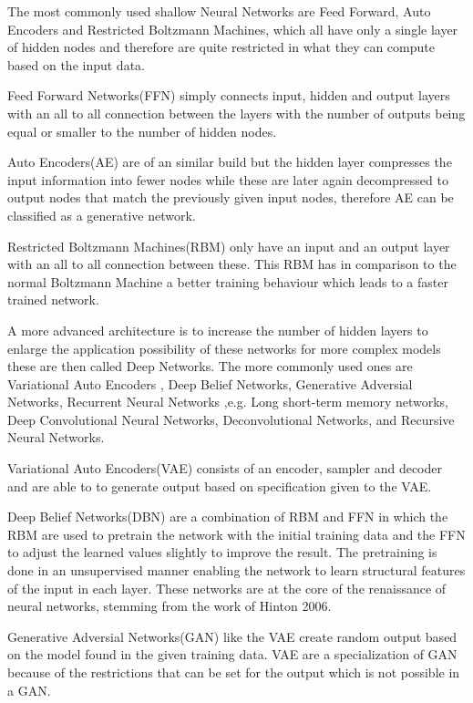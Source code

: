 \documentclass[conference]{IEEEtran}
\begin{document}

The most commonly used shallow Neural Networks are Feed Forward, Auto Encoders and Restricted Boltzmann Machines, which all have only a single layer of hidden nodes and therefore are quite restricted in what they can compute based on the input data. 

Feed Forward Networks(FFN) simply connects input, hidden and output layers with an all to all connection between the layers with the number of outputs being equal or smaller to the number of hidden nodes.

Auto Encoders(AE) are of an similar build but the hidden layer compresses the input information into fewer nodes while these are later again decompressed to output nodes that match the previously given input nodes, therefore AE can be classified as a generative network.

Restricted Boltzmann Machines(RBM) only have an input and an output layer with an all to all connection between these. This RBM has in comparison to the normal Boltzmann Machine a better training behaviour which leads to a faster trained network.

A more advanced architecture is to increase the number of hidden layers to enlarge the application possibility of these networks for more complex models these are then called Deep Networks. The more commonly used ones are Variational Auto Encoders , Deep Belief Networks, Generative Adversial Networks, Recurrent Neural Networks ,e.g. Long short-term memory networks, Deep Convolutional Neural Networks, Deconvolutional Networks, and Recursive Neural Networks.

Variational Auto Encoders(VAE) consists of an encoder, sampler and decoder and are able to to generate output based on specification given to the VAE. 

Deep Belief Networks(DBN) are a combination of RBM and FFN in which the RBM are used to pretrain the network with the initial training 
data and the FFN to adjust the learned values slightly to improve the result. The pretraining is done in an unsupervised manner enabling the network to learn structural features of the input in each layer. These networks are at the core of the renaissance of neural networks, stemming from the work of Hinton 2006\cite{hinton2006fast}.

Generative Adversial Networks(GAN) like the VAE create random output based on the model found in the given training data. VAE are a specialization of GAN because of the restrictions that can be set for the output which is not possible in a GAN.
\end{document}
